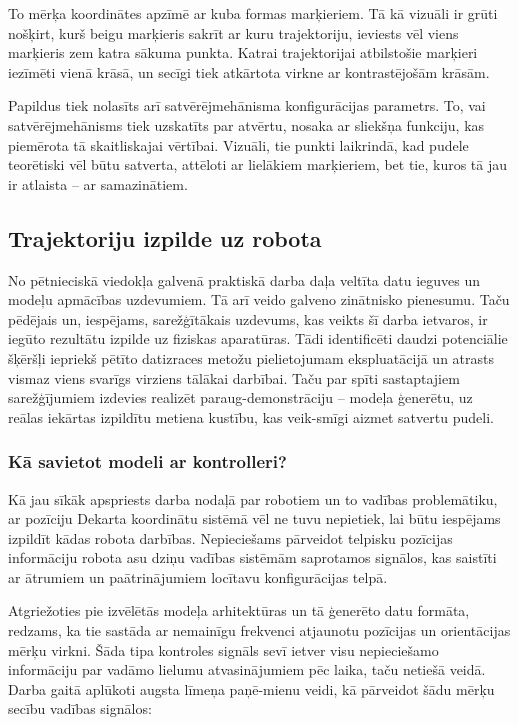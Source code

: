 \documentclass[12pt, a4paper]{article}
\numberwithin{equation}{section} %
\begin{document}
To mērķa koordinātes apzīmē ar kuba formas marķieriem. Tā kā vizuāli ir grūti nošķirt, kurš beigu marķieris sakrīt ar kuru trajektoriju, ieviests vēl viens marķieris zem katra sākuma punkta. Katrai trajektorijai atbilstošie marķieri iezīmēti vienā krāsā, un secīgi tiek atkārtota virkne ar kontrastējošām krāsām. 

Papildus tiek nolasīts arī satvērējmehānisma konfigurācijas parametrs. To, vai satvērējmehānisms tiek uzskatīts par atvērtu, nosaka ar sliekšņa funkciju, kas piemērota tā skaitliskajai vērtībai. Vizuāli, tie punkti laikrindā, kad pudele teorētiski vēl būtu satverta, attēloti ar lielākiem marķieriem, bet tie, kuros tā jau ir atlaista -- ar samazinātiem.
 

\subsection{Trajektoriju izpilde uz robota}

No pētnieciskā viedokļa galvenā praktiskā darba daļa veltīta datu ieguves un modeļu apmācības uzdevumiem. Tā arī veido galveno zinātnisko pienesumu. Taču pēdējais un, iespējams, sarežģītākais uzdevums, kas veikts šī darba ietvaros, ir iegūto rezultātu izpilde uz fiziskas aparatūras. Tādi identificēti daudzi potenciālie šķēršļi iepriekš pētīto datizraces metožu pielietojumam ekspluatācijā un atrasts vismaz viens svarīgs virziens tālākai darbībai. Taču par spīti sastaptajiem sarežģījumiem izdevies realizēt paraug-demonstrāciju -- modeļa ģenerētu, uz reālas iekārtas izpildītu metiena kustību, kas veik-smīgi aizmet satvertu pudeli.

\subsubsection{Kā savietot modeli ar kontrolleri?}

Kā jau sīkāk apspriests darba nodaļā par robotiem un to vadības problemātiku, ar pozīciju Dekarta koordinātu sistēmā vēl ne tuvu nepietiek, lai būtu iespējams izpildīt kādas robota darbības. Nepieciešams pārveidot telpisku pozīcijas informāciju robota asu dziņu vadības sistēmām saprotamos signālos, kas saistīti ar ātrumiem un paātrinājumiem locītavu konfigurācijas telpā. 

Atgriežoties pie izvēlētās modeļa arhitektūras un tā ģenerēto datu formāta, redzams, ka tie sastāda ar nemainīgu frekvenci atjaunotu pozīcijas un orientācijas mērķu virkni. Šāda tipa kontroles signāls sevī ietver visu nepieciešamo informāciju par vadāmo lielumu atvasinājumiem pēc laika, taču netiešā veidā. Darba gaitā aplūkoti augsta līmeņa paņē-mienu veidi, kā pārveidot šādu mērķu secību vadības signālos:
\end{document}
